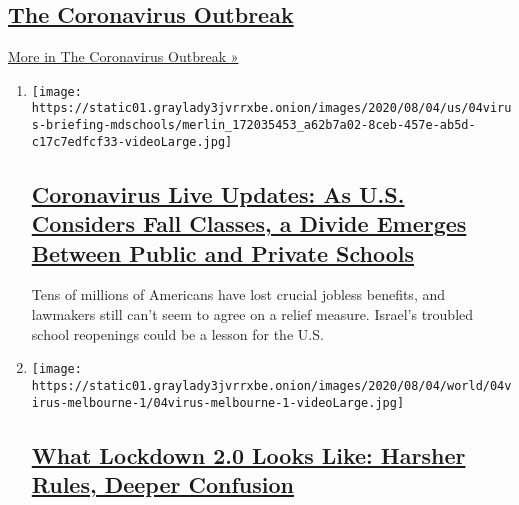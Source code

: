 \hypertarget{the-coronavirus-outbreak}{%
\subsection{\texorpdfstring{\href{/news-event/coronavirus}{The
Coronavirus
Outbreak}}{The Coronavirus Outbreak}}\label{the-coronavirus-outbreak}}

\href{/news-event/coronavirus}{More in The Coronavirus Outbreak »}

\begin{enumerate}
\def\labelenumi{\arabic{enumi}.}
\item
  \texttt{[image: https://static01.graylady3jvrrxbe.onion/images/2020/08/04/us/04virus-briefing-mdschools/merlin\_172035453\_a62b7a02-8ceb-457e-ab5d-c17c7edfcf33-videoLarge.jpg]}

  \hypertarget{coronavirus-live-updates-as-us-considers-fall-classes-a-divide-emerges-between-public-and-private-schools}{%
  \subsection{\texorpdfstring{\href{/2020/08/04/world/coronavirus-cases.html}{Coronavirus
  Live Updates: As U.S. Considers Fall Classes, a Divide Emerges Between
  Public and Private
  Schools}}{Coronavirus Live Updates: As U.S. Considers Fall Classes, a Divide Emerges Between Public and Private Schools}}\label{coronavirus-live-updates-as-us-considers-fall-classes-a-divide-emerges-between-public-and-private-schools}}

  Tens of millions of Americans have lost crucial jobless benefits, and
  lawmakers still can't seem to agree on a relief measure. Israel's
  troubled school reopenings could be a lesson for the U.S.
\item
  \texttt{[image: https://static01.graylady3jvrrxbe.onion/images/2020/08/04/world/04virus-melbourne-1/04virus-melbourne-1-videoLarge.jpg]}

  \hypertarget{what-lockdown-20-looks-like-harsher-rules-deeper-confusion}{%
  \subsection{\texorpdfstring{\href{/2020/08/04/world/australia/coronavirus-melbourne-lockdown.html}{What
  Lockdown 2.0 Looks Like: Harsher Rules, Deeper
  Confusion}}{What Lockdown 2.0 Looks Like: Harsher Rules, Deeper Confusion}}\label{what-lockdown-20-looks-like-harsher-rules-deeper-confusion}}


\end{enumerate}
